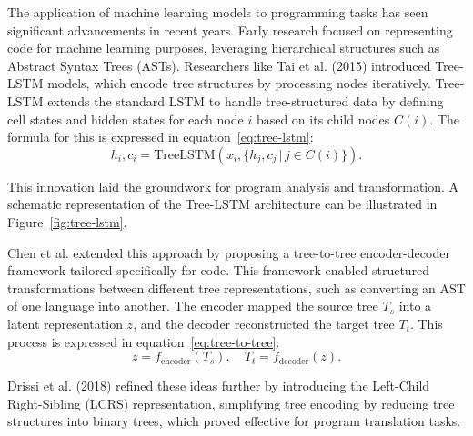 \documentclass{dhbenelux}
\begin{document}
The application of machine learning models to programming tasks has seen significant advancements in recent years. Early research focused on representing code for machine learning purposes, leveraging hierarchical structures such as Abstract Syntax Trees (ASTs). Researchers like Tai et al. (2015) \cite{tai2015} introduced Tree-LSTM models, which encode tree structures by processing nodes iteratively. Tree-LSTM extends the standard LSTM to handle tree-structured data by defining cell states and hidden states for each node \( i \) based on its child nodes \( C(i) \). The formula for this is expressed in equation~\ref{eq:tree-lstm}:
\begin{equation}
h_i, c_i = \text{TreeLSTM}(x_i, \{h_{j}, c_{j} \,|\, j \in C(i)\}).
\label{eq:tree-lstm}
\end{equation}

This innovation laid the groundwork for program analysis and transformation. A schematic representation of the Tree-LSTM architecture can be illustrated in Figure~\ref{fig:tree-lstm}.



Chen et al. \cite{chen2018} extended this approach by proposing a tree-to-tree encoder-decoder framework tailored specifically for code. This framework enabled structured transformations between different tree representations, such as converting an AST of one language into another. The encoder mapped the source tree \( T_s \) into a latent representation \( z \), and the decoder reconstructed the target tree \( T_t \). This process is expressed in equation~\ref{eq:tree-to-tree}:
\begin{equation}
z = f_{\text{encoder}}(T_s), \quad T_t = f_{\text{decoder}}(z).
\label{eq:tree-to-tree}
\end{equation}

Drissi et al. (2018)\cite{drissi2018} refined these ideas further by introducing the Left-Child Right-Sibling (LCRS) representation, simplifying tree encoding by reducing tree structures into binary trees, which proved effective for program translation tasks.
\end{document}

